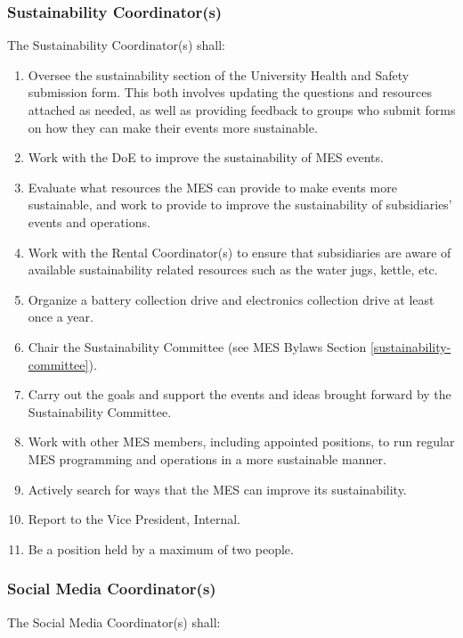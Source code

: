 \subsubsection{Sustainability Coordinator(s)}
\label{sustainability-coordinators}
The Sustainability Coordinator(s) shall:

\begin{enumerate}
 \item
  Oversee the sustainability section of the University Health and Safety submission form. This both involves updating the questions and resources attached as needed, as well as providing feedback to groups who submit forms on how they can make their events more sustainable.
 \item
  Work with the DoE to improve the sustainability of MES events.
 \item
  Evaluate what resources the MES can provide to make events more sustainable, and work to provide to improve the sustainability of subsidiaries' events and operations.
 \item
  Work with the Rental Coordinator(s) to ensure that subsidiaries are aware of available sustainability related resources such as the water jugs, kettle, etc.
 \item
  Organize a battery collection drive and electronics collection drive at least once a year.
 \item
  Chair the Sustainability Committee (see MES Bylaws Section \ref{sustainability-committee}).
 \item
  Carry out the goals and support the events and ideas brought forward by the Sustainability Committee.
 \item
  Work with other MES members, including appointed positions, to run regular MES programming and operations in a more sustainable manner.
 \item
  Actively search for ways that the MES can improve its sustainability.
 \item
  Report to the Vice President, Internal.
 \item
  Be a position held by a maximum of two people.

\end{enumerate}

\subsubsection{Social Media Coordinator(s)}
\label{social-media-coordinators}
The Social Media Coordinator(s) shall:

